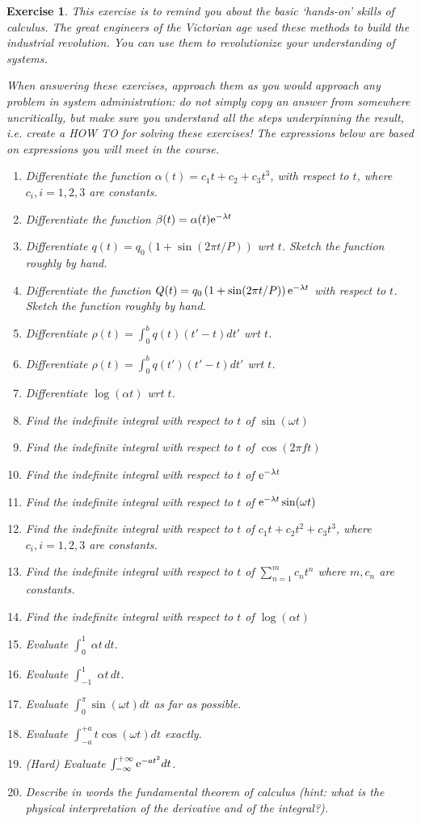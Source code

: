 \documentclass{book}
\newtheorem{exercise}{Exercise}
\def\e{{\rm e}}
\begin{document}
\begin{exercise} 
This exercise is to remind you about the basic `hands-on' skills of calculus.
The great engineers of the Victorian age used these methods to build the
industrial revolution. You can use them to revolutionize your understanding
of systems.

When answering these exercises, approach them as you would approach
any problem in system administration: do not simply copy an answer
from somewhere uncritically, but make sure you understand all the steps
underpinning the result, i.e. create a HOW TO for solving these exercises!
The expressions below are based on expressions you will meet in the course.

\begin{enumerate}
\item Differentiate the function $\alpha(t)= c_1 t + c_2 + c_3 t^3$, with respect to $t$, where $c_i, i = 1,2,3$ are constants.
\item Differentiate the function $\beta(t)=\alpha(t)\e^{-\lambda t}$
\item Differentiate $q(t) = q_0 \left(1+\sin(2\pi t/P)\right)$ wrt $t$. Sketch
the function roughly by hand.
\item Differentiate the function $Q(t) = q_0 \left(1+\sin(2\pi t/P)\right)\e^{-\lambda t}$ with respect to $t$. Sketch the function roughly by hand.
\item Differentiate $\rho(t) = \int_0^b q(t)(t'-t)dt'$ wrt $t$.
\item Differentiate $\rho(t) = \int_0^b q(t')(t'-t)dt'$ wrt $t$.
\item Differentiate $\log(\alpha t)$ wrt $t$.
\item Find the indefinite integral with respect to $t$ of $\sin(\omega t)$
\item Find the indefinite integral with respect to $t$ of $\cos(2\pi f t)$
\item Find the indefinite integral with respect to $t$ of $\e^{-\lambda t}$
\item Find the indefinite integral with respect to $t$ of $\e^{-\lambda t}\sin(\omega t)$
\item Find the indefinite integral with respect to $t$ of $c_1 t+c_2 t^2+c_3 t^3$, where $c_i, i=1,2,3$ are constants.
\item Find the indefinite integral with respect to $t$ of $\sum_{n=1}^m c_n t^n$ where $m,c_n$ are constants.
\item Find the indefinite integral with respect to $t$ of $\log(\alpha t)$
\item Evaluate $\int_0^1\;\alpha t\,dt$.
\item Evaluate $\int_{-1}^1\;\alpha t\,dt$.
\item Evaluate $\int_0^\pi \sin(\omega t)dt$ as far as possible.
\item Evaluate $\int_{-a}^{+a} t\cos(\omega t)dt$ exactly.
\item (Hard) Evaluate $\int_{-\infty}^{+\infty} \e^{-a t^2} dt$.
\item Describe in words the fundamental theorem of calculus (hint: what is the physical interpretation of the derivative and of the integral?).
\end{enumerate}
\end{exercise}
\end{document}

